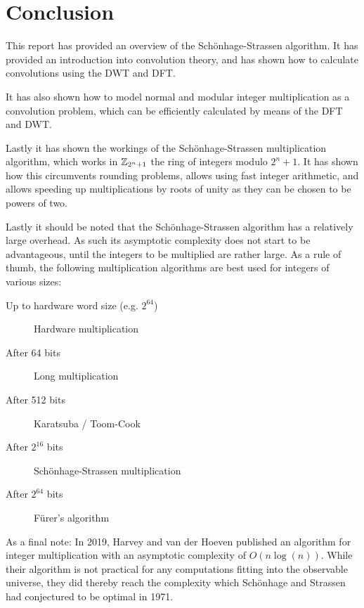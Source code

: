 \chapter{Conclusion}
\label{chapter:conclusion}

This report has provided an overview of the Schönhage-Strassen algorithm. It
has provided an introduction into convolution theory, and has shown how to
calculate convolutions using the DWT and DFT.

It has also shown how to model normal and modular integer multiplication as a
convolution problem, which can be efficiently calculated by means of the DFT
and DWT.

Lastly it has shown the workings of the Schönhage-Strassen multiplication
algorithm, which works in $\mathbb{Z}_{2^n + 1}$ the ring of integers modulo $2^n
+ 1$. It has shown how this circumvents rounding problems, allows using fast
integer arithmetic, and allows speeding up multiplications by roots of unity
as they can be chosen to be powers of two.

Lastly it should be noted that the Schönhage-Strassen algorithm has a
relatively large overhead. As such its asymptotic complexity does not start to
be advantageous, until the integers to be multiplied are rather large. As a
rule of thumb, the following multiplication algorithms are best used for
integers of various sizes:

\begin{description}
		\item[Up to hardware word size (e.g. $2^{64}$)] Hardware multiplication
		\item[After 64 bits] Long multiplication
		\item[After 512 bits] Karatsuba / Toom-Cook
		\item[After $2^{16}$ bits] Schönhage-Strassen multiplication
		\item[After $2^{64}$ bits] Fürer's algorithm
\end{description}

As a final note: In 2019, Harvey and van der Hoeven published an algorithm for
integer multiplication with an asymptotic complexity of $O(n \log(n))$.
\autocite{harveyIntegerMultiplicationTime2021} While their algorithm is not
practical for any computations fitting into the observable universe, they did
thereby reach the complexity which Schönhage and Strassen had conjectured to be
optimal in 1971.
